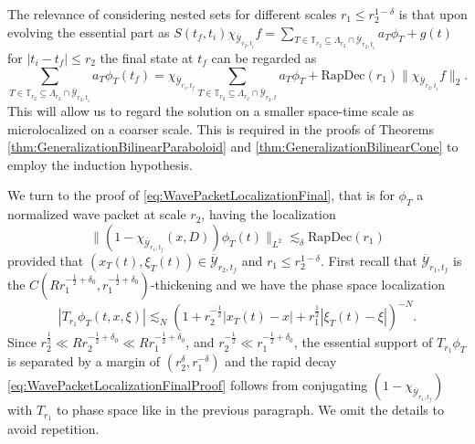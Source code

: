 \documentclass{amsart}
\theoremstyle{definition}
\newcommand{\T}{\mathbb{T}}
\begin{document}
The relevance of considering nested sets for different scales $r_1 \leq r_2^{1-\delta}$ is that upon evolving the essential part as $S(t_f,t_i) \chi_{\overline{\mathcal{Y}}_{r_2,t_i}} f= \sum_{T \in \T_{r_2} \subseteq \Lambda_{r_2} \cap \overline{\mathcal{Y}}_{r_2,t_i}} a_T \phi_T + g(t)$ for $|t_i-t_f| \leq r_2$ the final state at $t_f$ can be regarded as
\begin{equation}
    \label{eq:ExpansionDifferentScales}
    \sum_{T \in \T_{r_2} \subseteq \Lambda_{r_2} \cap \overline{\mathcal{Y}}_{r_2,t_i}} a_T \phi_T(t_f) = \chi_{\overline{\mathcal{Y}}_{r_1,t_f}} \sum_{T \in \T_{r_2} \subseteq \Lambda_{r_2} \cap \overline{\mathcal{Y}}_{r_2,t}} a_T \phi_T + \text{RapDec}(r_1) \| \chi_{\overline{\mathcal{Y}}_{r_2,t_i}} f \|_2.
\end{equation}
This will allow us to regard the solution on a smaller space-time scale as microlocalized on a coarser scale. This is required in the proofs of Theorems \ref{thm:GeneralizationBilinearParaboloid} and \ref{thm:GeneralizationBilinearCone} to employ the induction hypothesis.

We turn to the proof of \eqref{eq:WavePacketLocalizationFinal}, that is for $\phi_T$ a normalized wave packet at scale $r_2$, having the localization 
\begin{equation}
\label{eq:WavePacketLocalizationFinalProof}
    \| (1-\chi_{\overline{\mathcal{Y}}_{r_1,t_f}} (x,D)) \phi_T(t) \|_{L^2} \lesssim_{\delta} \text{RapDec}(r_1)
\end{equation}
provided that $(x_T(t),\xi_T(t)) \in \overline{\mathcal{Y}}_{r_2,t_f}$ and $r_1 \leq r_2^{1-\delta}$.
First recall that $\overline{\mathcal{Y}}_{r_1,t_f}$ is the $C( R r_1^{-\frac{1}{2}+\delta_0}, r_1^{-\frac{1}{2}+\delta_0})$-thickening and we have the phase space localization
\begin{equation*}
    |T_{r_1} \phi_T(t,x,\xi)| \lesssim_N (1+ r_2^{-\frac{1}{2}} |x_T(t) - x| + r^{\frac{1}{2}}_1 |\xi_T(t) - \xi|)^{-N}.
\end{equation*}
Since $r_2^{\frac{1}{2}} \ll R r_2^{-\frac{1}{2}+\delta_0} \ll R r_1^{-\frac{1}{2}+\delta_0}$, and $r_2^{-\frac{1}{2}} \ll r_1^{-\frac{1}{2}+\delta_0}$, the essential support of $T_{r_1} \phi_T$ is separated by a margin of $(r_2^{\delta},r_1^{-\delta})$ and the rapid decay \eqref{eq:WavePacketLocalizationFinalProof} follows from conjugating $(1-\chi_{\overline{\mathcal{Y}}_{r_1,t_f}})$ with $T_{r_1}$ to phase space like in the previous paragraph. We omit the details to avoid repetition. 
\end{document}
